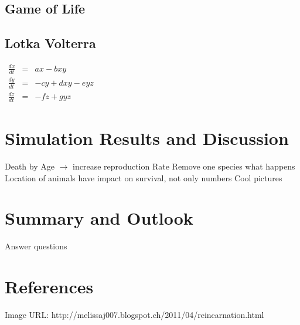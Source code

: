 \documentclass[11pt]{article}
\begin{document}
\subsection{Game of Life}

\subsection{Lotka Volterra}

$
\begin{array}{rcl}
\frac{dx}{dt} & = & ax-bxy \\ 
\frac{dy}{dt} & = & -cy+dxy-eyz \\ 
\frac{dz}{dt} & = & -fz+gyz
\end{array}
$
\section{Simulation Results and Discussion}
Death by Age $\rightarrow$ increase reproduction Rate
Remove one species what happens
Location of animals have impact on survival, not only numbers
Cool pictures

\section{Summary and Outlook}
Answer questions


\section{References}
Image URL: http://melissaj007.blogspot.ch/2011/04/reincarnation.html



\end{document}
